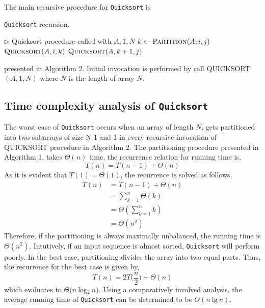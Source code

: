 \documentclass[a4paper,10pt]{article}
\begin{document}
\begin{multicols*}{2}
The main recursive procedure for \texttt{Quicksort} is

\begin{algorithm}[H]
\caption{\texttt{Quicksort} recursion.}\label{Q2}
\begin{algorithmic}[1]
\Statex \(\triangleright\) Quicksort procedure called with $A, 1, N$
    \State $k \gets \textsc{Partition}(A,i,j)$
    \State $\textsc{Quicksort}(A,i,k)$
    \State $\textsc{Quicksort}(A,k+1,j)$
\EndIf
\EndProcedure
\end{algorithmic}
\end{algorithm}

\noindent
presented in Algorithm 2. Initial invocation is performed by call QUICKSORT$(A, 1, N)$ where $N$ is the length of array $N$.

\subsection{Time complexity analysis of \texttt{Quicksort}}

The worst case of \texttt{Quicksort} occurs when an array of length $N$, gets partitioned into two subarrays of size N-1 and 1 in every recursive invocation of QUICKSORT procedure in Algorithm 2. The partitioning procedure presented in Algorithm 1, takes $\Theta(n)$ time, the recurrence relation for running time is,
$$T(n) = T(n-1) + \Theta(n)$$
As it is evident that $T(1) = \Theta(1)$, the recurrence is solved as follows,
\begin{align*}
T(n) &= T(n-1) + \Theta(n)\\
&= \sum_{k=1}^n\Theta(k) \\ 
&= \Theta \left ( \sum_{k=1}^n k \right )\\
&= \Theta(n^2)
\end{align*}
Therefore, if the partitioning is always maximally unbalanced, the running time is $\Theta(n^2)$. Intutively, if an input sequence is almost sorted, \texttt{Quicksort} will perform poorly. In the best case, partitioning divides the array into two equal parts. Thus, the recurrence for the best case is given by,
$$T(n) = 2T\bigg(\frac{n}{2}\bigg) + \Theta(n)$$
    which evaluates to $\Theta(n\: $log${}_2\: n)$. Using a comparatively involved analysis, the average running time of \texttt{Quicksort} can be determined to be $O(n\: \text{lg}\: n)$.


\end{multicols*}
\end{document}
